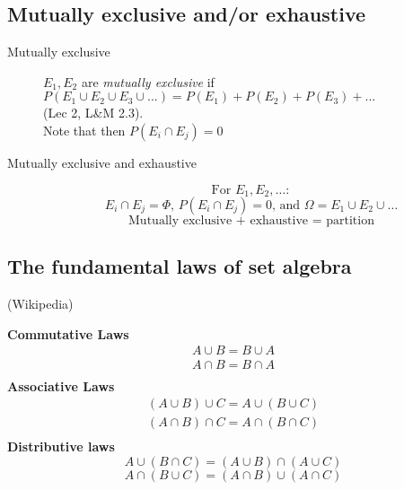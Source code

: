 \subsection{Mutually exclusive and/or exhaustive}
    \begin{description}
    
    	\item[Mutually exclusive] ${E_1}, {E_2}$ are \textit{mutually exclusive} if 
        		$P({E_1} \cup {E_2} \cup {E_3} \cup ...) = P({E_1}) + P({E_2}) + P({E_3}) + ...$   \\
		{ \tiny (Lec 2, L\&M 2.3)}.   \\
		Note that then $ P(E_i \cap E_j) = 0 $
    
    
    	\item[Mutually exclusive and exhaustive] 
	\[ \mbox{For } E_1, E_2, \dots:  \]
	\[ E_i \cap E_j = \Phi \mbox{, } P(E_i \cap E_j) = 0 \mbox{, and } \Omega = E_1 \cup E_2 \cup \dots \]
	\[ \mbox{ Mutually exclusive + exhaustive = partition } \]
    \end{description}

\subsection{The fundamental laws of set algebra} {\tiny (Wikipedia)}

	\textbf{Commutative Laws}
		\begin{align*}
			A \cup B = B \cup A   \\
			A \cap B = B \cap A   \\
		\end{align*}
     \textbf{Associative Laws}
		\begin{align*}
			(A \cup B) \cup C = A \cup (B \cup C) \\
			(A \cap B) \cap C = A \cap (B \cap C) \\
		\end{align*}
	\textbf{Distributive laws}
		\[ A \cup (B \cap C) = (A \cup B) \cap (A \cup C)   \]
		\[ A \cap (B \cup C) = (A \cap B) \cup (A \cap C) \]
    
	
